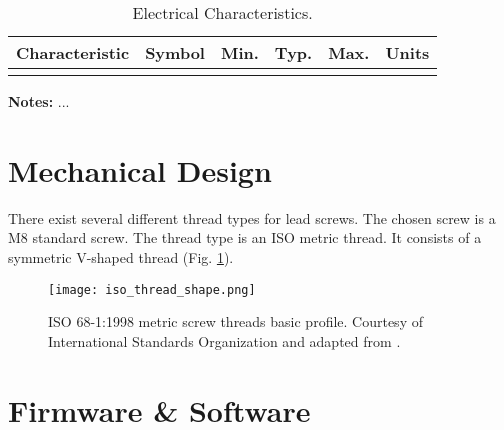 \begin{table}[htbp]
    \caption{Electrical Characteristics.}
    \centering
    \begin{threeparttable}
        \begin{tabular}{l|c|c|c|c|c}
        \toprule
              \textbf{Characteristic} & \textbf{Symbol} & \textbf{Min.} & \textbf{Typ.} & \textbf{Max.} & \textbf{Units} \\
        \midrule
             & & & & & \\
        \bottomrule
        \end{tabular}
        \begin{tablenotes}
                \small
                \item \textbf{Notes:} ...
            \end{tablenotes}
    \end{threeparttable}
    \label{tab:print_head_electric_characteristics}
\end{table}




\section{Mechanical Design}
\label{sec:bioprinting_system_mechanical_design}

There exist several different thread types for lead screws. The chosen screw is a M8 standard screw. The thread type is an ISO metric thread. It consists of a symmetric V-shaped thread (Fig. \ref{fig:iso_thread_shape}).\\

\begin{figure}[htbp]
	\centering
	\texttt{[image: iso\_thread\_shape.png]}
	\caption{ISO 68-1:1998 metric screw threads basic profile. Courtesy of International Standards Organization and adapted from \cite{ISO1998_metric_lead_screw_threads}.}
	\label{fig:iso_thread_shape}
\end{figure}



\section{Firmware \& Software}
\label{sec:bioprinting_system_fw_sw}

